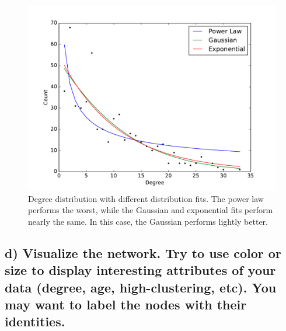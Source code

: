 \documentclass{tufte-handout}
\begin{document}
\begin{figure}
  \includegraphics{fit_comparison.pdf}
  \caption{Degree distribution with different distribution fits. The power law performs the worst, while the Gaussian and exponential fits perform nearly the same. In this case, the Gaussian performs lightly better.
  }
  \label{fig:textfig}
\end{figure}

\clearpage
\subsection{d) Visualize the network. Try to use color or size to display interesting attributes of your data (degree, age, high-clustering, etc). You may want to label the nodes with their identities.}

\end{document}

